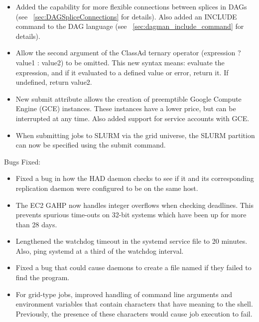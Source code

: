 \begin{itemize}
\item Added the capability for more flexible connections between
splices in DAGs (see ~\ref{sec:DAGSpliceConnections} for details).
Also added an INCLUDE command to the DAG language (see
~\ref{sec:dagman_include_command} for details).

\item Allow the second argument of the ClassAd ternary operator
(expression ? value1 : value2) to be omitted.  This new syntax means:
evaluate the expression, and if it evaluated to a defined value or
error, return it.  If undefined, return value2.

\item New submit attribute  allows the
creation of preemptible Google Compute Engine (GCE) instances.
These instances have a lower price, but can be interrupted at any time.
Also added support for service accounts with GCE.

\item When submitting jobs to SLURM via the grid universe, the SLURM
partition can now be specified using the 
submit command.

\end{itemize}

\noindent Bugs Fixed:

\begin{itemize}

\item Fixed a bug in how the HAD daemon checks to see if it and its
corresponding replication daemon were configured to be on the same host.

\item The EC2 GAHP now handles integer overflows when checking deadlines.
This prevents spurious time-outs on 32-bit systems which have been up for
more than 28 days.

\item Lengthened the watchdog timeout in the systemd service file to 20 minutes.
Also, ping systemd at a third of the watchdog interval.

\item Fixed a bug that could cause daemons to create a file named
 if they failed to find the 
program.

\item For grid-type  jobs, improved handling of command
line arguments and environment variables that contain characters that
have meaning to the shell.
Previously, the presence of these characters would cause job execution
to fail.

\end{itemize}


